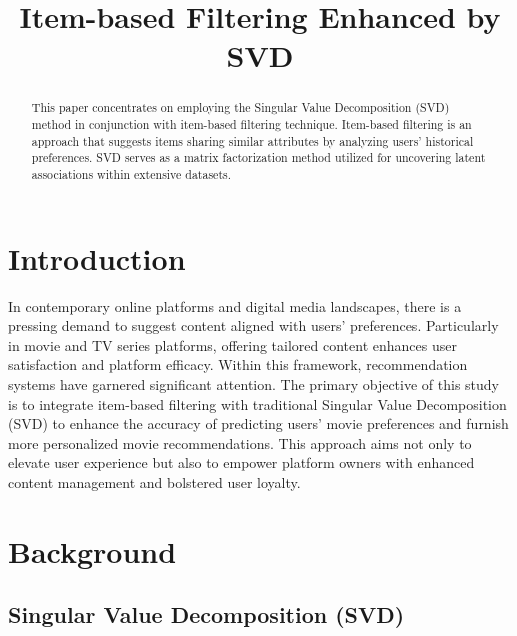 \documentclass[conference]{IEEEtran}
\begin{document}
	
	\title{Item-based Filtering Enhanced by SVD\\
	}
	
	\author{
	}
	
	\maketitle
	
	\begin{abstract}
		This paper concentrates on employing the Singular Value Decomposition (SVD) method in conjunction with item-based filtering technique. Item-based filtering is an approach that suggests items sharing similar attributes by analyzing users' historical preferences. SVD serves as a matrix factorization method utilized for uncovering latent associations within extensive datasets.
	\end{abstract}
	
	\section{Introduction}
	In contemporary online platforms and digital media landscapes, there is a pressing demand to suggest content aligned with users' preferences. Particularly in movie and TV series platforms, offering tailored content enhances user satisfaction and platform efficacy. Within this framework, recommendation systems have garnered significant attention. The primary objective of this study is to integrate item-based filtering with traditional Singular Value Decomposition (SVD) to enhance the accuracy of predicting users' movie preferences and furnish more personalized movie recommendations. This approach aims not only to elevate user experience but also to empower platform owners with enhanced content management and bolstered user loyalty.
	
	\section{Background}
	
	\subsection{Singular Value Decomposition (SVD) }
	
\end{document}
